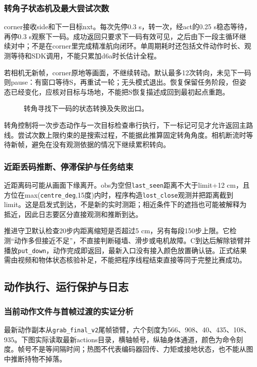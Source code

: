 \subsubsection{转角子状态机及最大尝试次数}
corner接收side和下一目标nxt。每次先停0.3 s，转一次，经act的0.25 s稳态等待，再停0.3 s观察下一码。成功返回只要求下一码有效可见，之后由下一段主循环继续对中；不是在corner里完成精准航向闭环。单周期耗时还包括文件动作时长、观测等待和SDK调用，不能只累加d6a时长估计全程。

若相机无新帧，corner原地等画面，不继续转动。默认最多12次转向，未见下一码则pause：有窗口等待S，再重试一轮；无头模式退出。恢复保留任务阶段，但姿态已经变化，应核对目标与场地，不能把S恢复描述成回到最初起点重跑。
\begin{figure}[H]\centering\caption{转角寻找下一码的状态转换及失败出口。}\end{figure}

转角控制将一次步态动作与一次目标检查串行执行，下一标记可见才允许返回主路线。尝试次数上限约束的是搜索过程，不能据此推算固定转角角度。相机断流时等待新帧，避免在没有观测依据的情况下继续累积转向。


\subsubsection{近距丢码推断、停滞保护与任务结束}
近距离码可能从画面下缘离开。obs为空但\texttt{last\_\allowbreak seen}距离不大于limit+12 cm，且方位在max(\texttt{centre\_\allowbreak deg},15度)内时，程序构造\texttt{lost\_\allowbreak close}观测并把距离截到limit。这是启发式到达，不是新的实时测距；相近条件下的遮挡也可能被解释为抵近，因此日志要区分直接观测和推断到达。

推进守卫默认检查20步内距离缩短是否超过5 cm，另有每段150步上限。它检测“动作多但接近不足”，不直接判断碰墙、滑步或电机故障。C到达后解除锁臂并播放\texttt{put\_\allowbreak down}，动作完成即返回，最新入口没有接入颜色放置确认链。正式结果需由视频和物体状态核验补足，不能把程序线程结束直接等同于完整比赛成功。

\subsection{动作执行、运行保护与日志}
\subsubsection{当前动作文件与首帧过渡的实证分析}
最新动作副本从\texttt{grab\_\allowbreak final\_\allowbreak v2}尾帧锁臂，六个刻度为566、908、40、435、108、935。下图实际读取最新actions目录，横轴帧号，纵轴身体通道，颜色为命令刻度。帧号不是等间隔时间；热图不代表编码器回传、力矩或接地状态，也不能从图中推断持物不掉落。

